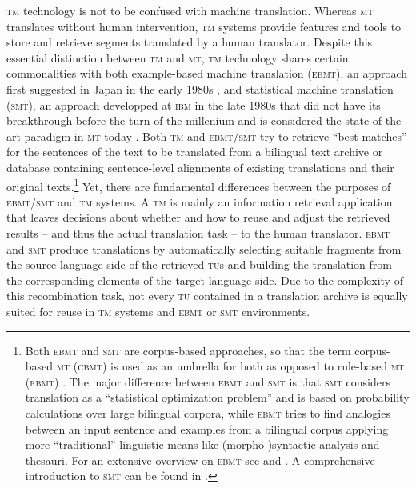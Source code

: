 \documentclass[output=paper]{LSP/langsci}
\begin{document}
\textsc{tm} technology is not to be confused with machine translation. Whereas \textsc{mt} translates without human intervention, \textsc{tm} systems provide features and tools to store and retrieve segments translated by a human translator. Despite this essential distinction between \textsc{tm} and \textsc{mt}, \textsc{tm} technology shares certain commonalities with both example-based machine translation (\textsc{ebmt}), an approach first suggested in Japan in the early 1980s \citep{Nagao1984}, and statistical machine translation (\textsc{smt}), an approach developped at \textsc{ibm} in the late 1980s \citep{BrownEtAl1988} that did not have its breakthrough before the turn of the millenium and is considered the state-of-the art paradigm in \textsc{mt} today \citep[17f]{Koehn2010}. Both \textsc{tm} and \textsc{ebmt}/\textsc{smt} try to retrieve ``best matches'' for the sentences of the text to be translated from a bilingual text archive or database containing sentence-level alignments of existing translations and their original texts.\footnote{Both \textsc{ebmt} and \textsc{smt} are corpus-based approaches, so that the term corpus-based \textsc{mt} (\textsc{cbmt}) is used as an umbrella for both as opposed to rule-based \textsc{mt} (\textsc{rbmt}) \citep[xviii]{Carl2003}. The major difference between \textsc{ebmt} and \textsc{smt} is that \textsc{smt} considers translation as a ``statistical optimization problem'' \citep[17]{Koehn2010} and is based on probability calculations over large bilingual corpora, while \textsc{ebmt} tries to find analogies between an input sentence and examples from a bilingual corpus applying more ``traditional'' linguistic means like (morpho-)syntactic analysis and thesauri. For an extensive overview on \textsc{ebmt} see \citet{Carl2003} and \citet{Somers2001}. A comprehensive introduction to \textsc{smt} can be found in \citet{Koehn2010}.} Yet, there are fundamental differences between the purposes of \textsc{ebmt}/\textsc{smt} and \textsc{tm} systems. A \textsc{tm} is mainly an information retrieval application that leaves decisions about whether and how to reuse and adjust the retrieved results -- and thus the actual translation task -- to the human translator. \textsc{ebmt} and \textsc{smt} produce translations by automatically selecting suitable fragments from the source language side of the retrieved \textsc{tu}s and building the translation from the corresponding elements of the target language side. Due to the complexity of this recombination task, not every \textsc{tu} contained in a translation archive is equally suited for reuse in \textsc{tm} systems and \textsc{ebmt} or \textsc{smt} environments. \largerpage %
\end{document}

